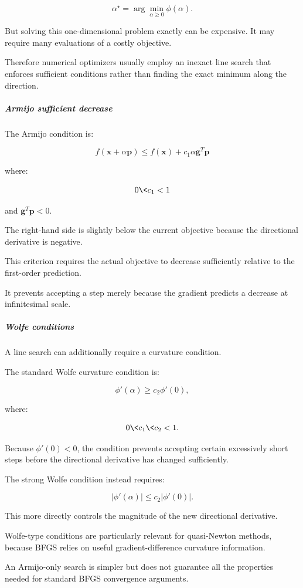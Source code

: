 \[
\alpha^\star=\arg\min_{\alpha\ge0}\phi(\alpha).
\]

But solving this one-dimensional problem exactly can be expensive. It may require many evaluations of a costly objective.

Therefore numerical optimizers usually employ an inexact line search that enforces sufficient conditions rather than finding the exact minimum along the direction.

\subparagraph{Armijo sufficient decrease}\label{armijo-sufficient-decrease}

The Armijo condition is:

\[
\boxed{ f(\mathbf x+\alpha\mathbf p) \le f(\mathbf x)+c_1\alpha\mathbf g^T\mathbf p }
\]

where:

\[
0\<c_1<1
\]

and \(\mathbf g^T\mathbf p<0\).

The right-hand side is slightly below the current objective because the directional derivative is negative.

This criterion requires the actual objective to decrease sufficiently relative to the first-order prediction.

It prevents accepting a step merely because the gradient predicts a decrease at infinitesimal scale.

\subparagraph{Wolfe conditions}\label{wolfe-conditions}

A line search can additionally require a curvature condition.

The standard Wolfe curvature condition is:

\[
\phi'(\alpha)\ge c_2\phi'(0),
\]

where:

\[
0\<c_1\<c_2<1.
\]

Because \(\phi'(0)<0\), the condition prevents accepting certain excessively short steps before the directional derivative has changed sufficiently.

The strong Wolfe condition instead requires:

\[
\boxed{ |\phi'(\alpha)|\le c_2|\phi'(0)| }.
\]

This more directly controls the magnitude of the new directional derivative.

Wolfe-type conditions are particularly relevant for quasi-Newton methods, because BFGS relies on useful gradient-difference curvature information.

An Armijo-only search is simpler but does not guarantee all the properties needed for standard BFGS convergence arguments.

